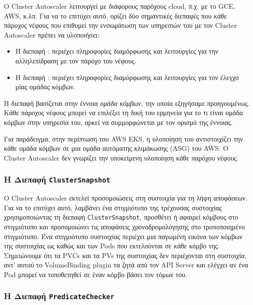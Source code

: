 Ο Cluster Autoscaler λειτουργεί με διάφορους παρόχους cloud, π.χ. με το GCE,
AWS, κ.λπ. Για να το επιτύχει αυτό, ορίζει δύο σημαντικές διεπαφές που κάθε
πάροχος νέφους που επιθυμεί την ενσωμάτωση των υπηρεσιών του με τον Cluster
Autoscaler πρέπει να υλοποιήσει:
\begin{itemize}
      \tightlist
      \item Η διεπαφή : περιέχει πληροφορίες διαμόρφωσης και
            λειτουργίες για την αλληλεπίδραση με τον πάροχο του νέφους.
      \item Η διεπαφή : περιέχει πληροφορίες διαμόρφωσης και
            λειτουργίες για τον έλεγχο μίας ομάδας κόμβων.
\end{itemize}

Η διεπαφή  βασίζεται στην έννοια \textit{ομάδα κόμβων}, την οποία
εξηγήσαμε προηγουμένως. Κάθε πάροχος νέφους μπορεί να επιλέξει τη δική του
ερμηνεία για το τι είναι ομάδα κόμβων στην υπηρεσία του, αρκεί να συμμορφώνεται
με τον ορισμό της έννοιας.

Για παράδειγμα, στην περίπτωση του AWS EKS, η υλοποίηση του 
αντιστοιχίζει την κάθε ομάδα κόμβων σε μια ομάδα αυτόματης κλιμάκωσης (ASG) του
AWS. Ο Cluster Autoscaler δεν γνωρίζει την υποκείμενη υλοποίηση κάθε παρόχου
νέφους.

\subsubsection{Η Διεπαφή \texttt{ClusterSnapshot}}

Ο Cluster Autoscaler εκτελεί προσομοιώσεις στη συστοιχία για τη λήψη αποφάσεων.
Για να το επιτύχει αυτό, λαμβάνει ένα στιγμιότυπο της τρέχουσας συστοιχίας
χρησιμοποιώντας τη διεπαφή \texttt{ClusterSnapshot}, προσθέτει ή αφαιρεί κόμβους
στο στιγμιότυπο και προσομοιώνει τις αποφάσεις χρονοδρομολόγησης στο
τροποποιημένο στιγμιότυπο.  Ένα στιγμιότυπο συστοιχίας περιέχει μια παγωμένη
εικόνα των κόμβων της συστοιχίας ως καθώς και των Pods που εκτελούνται σε κάθε
κόμβο της. Σημειώνουμε ότι τα PVCs και τα PVs της συστοιχίας δεν περιέχονται στη
συστοιχία, αντ' αυτού το VolumeBinding plugin τα ζητά από τον  API Server και
ελέγχει αν ένα Pod μπορεί να τοποθετηθεί σε έναν κόμβο βάσει τον τόμων του.

\subsubsection{Η Διεπαφή \texttt{PredicateChecker}}

